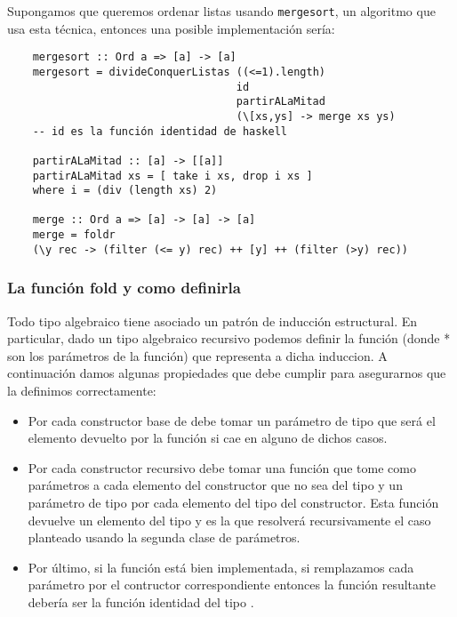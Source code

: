 Supongamos que queremos ordenar listas usando \texttt{mergesort}, un algoritmo que usa esta técnica, entonces una posible implementación sería:

\begin{centrado}
	\begin{verbatim}
	mergesort :: Ord a => [a] -> [a]
	mergesort = divideConquerListas ((<=1).length) 
									id  
									partirALaMitad
									(\[xs,ys] -> merge xs ys)	
	-- id es la función identidad de haskell

	partirALaMitad :: [a] -> [[a]]
	partirALaMitad xs = [ take i xs, drop i xs ] 
	where i = (div (length xs) 2)
	
	merge :: Ord a => [a] -> [a] -> [a]
	merge = foldr 
	(\y rec -> (filter (<= y) rec) ++ [y] ++ (filter (>y) rec))	 
	\end{verbatim}
\end{centrado}

\subsubsection{La función fold y como definirla}
Todo tipo algebraico tiene asociado un patrón de inducción estructural. En particular, dado un tipo algebraico recursivo  podemos definir la función  (donde * son los parámetros de la función) que representa a dicha induccion. A continuación damos algunas propiedades que debe cumplir  para asegurarnos que la definimos correctamente:
\begin{itemize}
	\item Por cada constructor base de  debe tomar un parámetro de tipo  que será el elemento devuelto por la función si cae en alguno de dichos casos.
	\item Por cada constructor recursivo debe tomar una función que tome como parámetros a cada elemento del constructor que no sea del tipo  y un parámetro de tipo  por cada elemento del tipo   del constructor. Esta función devuelve un elemento del tipo  y es la que resolverá recursivamente el caso planteado usando la segunda clase de parámetros.
	\item Por último, si la función está bien implementada, si remplazamos cada parámetro por el contructor correspondiente entonces la función resultante debería ser la función identidad del tipo .
\end{itemize}


